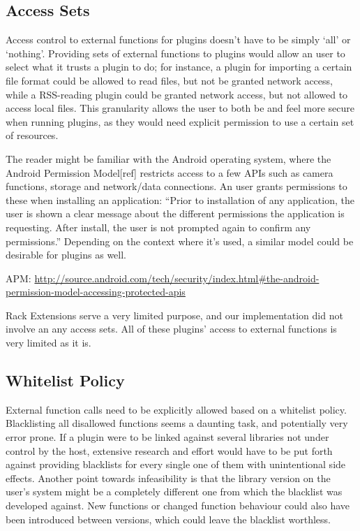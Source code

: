 \subsection {Access Sets}

Access control to external functions for plugins doesn't have to be simply `all'
or `nothing'. Providing sets of external functions to plugins would allow an
user to select what it trusts a plugin to do; for instance, a plugin for
importing a certain file format could be allowed to read files, but not be
granted network access, while a RSS-reading plugin could be granted network
access, but not allowed to access local files. This granularity allows the user
to both be and feel more secure when running plugins, as they would need
explicit permission to use a certain set of resources.

The reader might be familiar with the Android operating system, where the
Android Permission Model[ref] restricts access to a few APIs such as camera
functions, storage and network/data connections. An user grants permissions to
these when installing an application: ``Prior to installation of any
application, the user is shown a clear message about the different permissions
the application is requesting. After install, the user is not prompted again to
confirm any permissions.'' Depending on the context where it's used, a similar
model could be desirable for plugins as well.

APM: \url{http://source.android.com/tech/security/index.html#the-android-permission-model-accessing-protected-apis}

Rack Extensions serve a very limited purpose, and our implementation did not
involve an any access sets. All of these plugins' access to external functions
is very limited as it is.

\subsection {Whitelist Policy}

External function calls need to be explicitly allowed based on a whitelist
policy. Blacklisting all disallowed functions seems a daunting task, and
potentially very error prone. If a plugin were to be linked against several
libraries not under control by the host, extensive research and effort would
have to be put forth against providing blacklists for every single one of them
with unintentional side effects. Another point towards infeasibility is that the
library version on the user's system might be a completely different one from
which the blacklist was developed against. New functions or changed function
behaviour could also have been introduced between versions, which could leave
the blacklist worthless.

